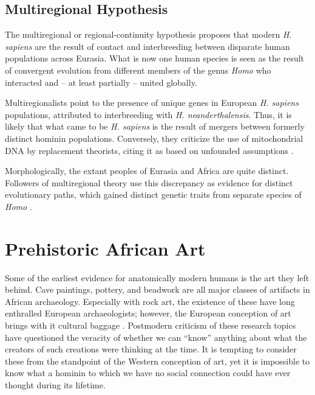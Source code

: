 \documentclass{../../../coursework}
\begin{document}
\subsection{Multiregional Hypothesis}

The multiregional or regional-continuity hypothesis proposes that modern
\emph{H. sapiens} are the result of contact and interbreeding between
disparate human populations across Eurasia. What is now one human species is
seen as the result of convergent evolution from different members of the genus
\emph{Homo} who interacted and -- at least partially -- united globally.

Multiregionalists point to the presence of unique genes in European
\emph{H. sapiens} populations, attributed to interbreeding with
\emph{H. neanderthalensis}. Thus, it is likely that what came to be
\emph{H. sapiens} is the result of mergers between formerly distinct hominin
populations. Conversely, they criticize the use of mitochondrial DNA by
replacement theorists, citing it as based on unfounded assumptions
\parencite{Kendrick2014}.

Morphologically, the extant peoples of Eurasia and Africa are quite distinct.
Followers of multiregional theory use this discrepancy as evidence for
distinct evolutionary paths, which gained distinct genetic traits from
separate species of \emph{Homo} \parencite{Kendrick2014}.

\section{Prehistoric African Art}

Some of the earliest evidence for anatomically modern humans is the art they
left behind. Cave paintings, pottery, and beadwork are all major classes of
artifacts in African archaeology. Especially with rock art, the existence of
these have long enthralled European archaeologists; however, the European
conception of art brings with it cultural baggage \parencite{Arnaut1991}.
Postmodern criticism of these research topics have questioned the veracity of
whether we can ``know'' anything about what the creators of such creations
were thinking at the time. It is tempting to consider these from the
standpoint of the Western conception of art, yet it is impossible to know what
a hominin to which we have no social connection could have ever thought during
its lifetime.

\printbibliography
\end{document}
